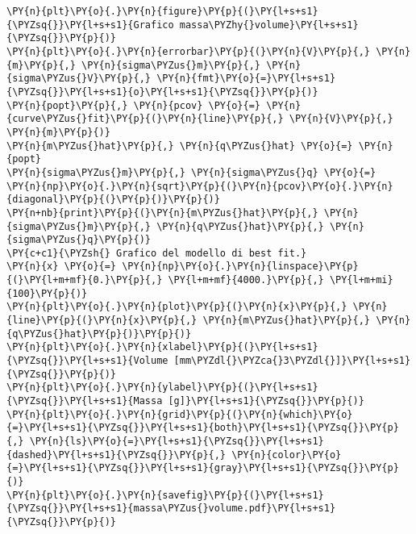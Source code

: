 \begin{Verbatim}[label=\makebox{\href{https://github.com/unipi-physics-labs/lab1-sheets/tree/main/snippy/densita.py}{https://github.com/.../densita.py}},commandchars=\\\{\}]
\PY{n}{plt}\PY{o}{.}\PY{n}{figure}\PY{p}{(}\PY{l+s+s1}{\PYZsq{}}\PY{l+s+s1}{Grafico massa\PYZhy{}volume}\PY{l+s+s1}{\PYZsq{}}\PY{p}{)}
\PY{n}{plt}\PY{o}{.}\PY{n}{errorbar}\PY{p}{(}\PY{n}{V}\PY{p}{,} \PY{n}{m}\PY{p}{,} \PY{n}{sigma\PYZus{}m}\PY{p}{,} \PY{n}{sigma\PYZus{}V}\PY{p}{,} \PY{n}{fmt}\PY{o}{=}\PY{l+s+s1}{\PYZsq{}}\PY{l+s+s1}{o}\PY{l+s+s1}{\PYZsq{}}\PY{p}{)}
\PY{n}{popt}\PY{p}{,} \PY{n}{pcov} \PY{o}{=} \PY{n}{curve\PYZus{}fit}\PY{p}{(}\PY{n}{line}\PY{p}{,} \PY{n}{V}\PY{p}{,} \PY{n}{m}\PY{p}{)}
\PY{n}{m\PYZus{}hat}\PY{p}{,} \PY{n}{q\PYZus{}hat} \PY{o}{=} \PY{n}{popt}
\PY{n}{sigma\PYZus{}m}\PY{p}{,} \PY{n}{sigma\PYZus{}q} \PY{o}{=} \PY{n}{np}\PY{o}{.}\PY{n}{sqrt}\PY{p}{(}\PY{n}{pcov}\PY{o}{.}\PY{n}{diagonal}\PY{p}{(}\PY{p}{)}\PY{p}{)}
\PY{n+nb}{print}\PY{p}{(}\PY{n}{m\PYZus{}hat}\PY{p}{,} \PY{n}{sigma\PYZus{}m}\PY{p}{,} \PY{n}{q\PYZus{}hat}\PY{p}{,} \PY{n}{sigma\PYZus{}q}\PY{p}{)}
\PY{c+c1}{\PYZsh{} Grafico del modello di best fit.}
\PY{n}{x} \PY{o}{=} \PY{n}{np}\PY{o}{.}\PY{n}{linspace}\PY{p}{(}\PY{l+m+mf}{0.}\PY{p}{,} \PY{l+m+mf}{4000.}\PY{p}{,} \PY{l+m+mi}{100}\PY{p}{)}
\PY{n}{plt}\PY{o}{.}\PY{n}{plot}\PY{p}{(}\PY{n}{x}\PY{p}{,} \PY{n}{line}\PY{p}{(}\PY{n}{x}\PY{p}{,} \PY{n}{m\PYZus{}hat}\PY{p}{,} \PY{n}{q\PYZus{}hat}\PY{p}{)}\PY{p}{)}
\PY{n}{plt}\PY{o}{.}\PY{n}{xlabel}\PY{p}{(}\PY{l+s+s1}{\PYZsq{}}\PY{l+s+s1}{Volume [mm\PYZdl{}\PYZca{}3\PYZdl{}]}\PY{l+s+s1}{\PYZsq{}}\PY{p}{)}
\PY{n}{plt}\PY{o}{.}\PY{n}{ylabel}\PY{p}{(}\PY{l+s+s1}{\PYZsq{}}\PY{l+s+s1}{Massa [g]}\PY{l+s+s1}{\PYZsq{}}\PY{p}{)}
\PY{n}{plt}\PY{o}{.}\PY{n}{grid}\PY{p}{(}\PY{n}{which}\PY{o}{=}\PY{l+s+s1}{\PYZsq{}}\PY{l+s+s1}{both}\PY{l+s+s1}{\PYZsq{}}\PY{p}{,} \PY{n}{ls}\PY{o}{=}\PY{l+s+s1}{\PYZsq{}}\PY{l+s+s1}{dashed}\PY{l+s+s1}{\PYZsq{}}\PY{p}{,} \PY{n}{color}\PY{o}{=}\PY{l+s+s1}{\PYZsq{}}\PY{l+s+s1}{gray}\PY{l+s+s1}{\PYZsq{}}\PY{p}{)}
\PY{n}{plt}\PY{o}{.}\PY{n}{savefig}\PY{p}{(}\PY{l+s+s1}{\PYZsq{}}\PY{l+s+s1}{massa\PYZus{}volume.pdf}\PY{l+s+s1}{\PYZsq{}}\PY{p}{)}


\end{Verbatim}
